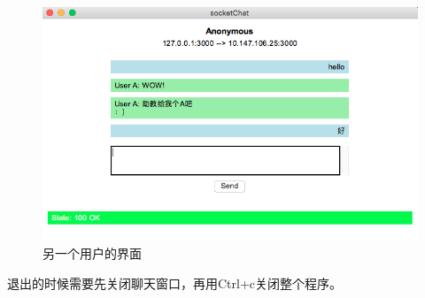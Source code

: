 \documentclass[a4paper, nofonts, nocap]{ctexart}
\begin{document}
\begin{figure}[ht]
	\centering
	\includegraphics[scale=0.6]{images/two.png}
	\caption{另一个用户的界面}
\end{figure}

退出的时候需要先关闭聊天窗口，再用Ctrl+c关闭整个程序。
\end{document}
